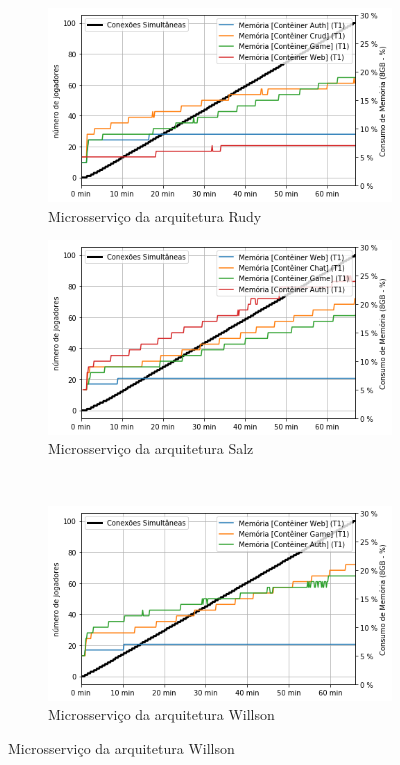 \begin{figure}[htb!]
    \caption{Consumo de memória dos microsserviços}
    \label{fig:experimento_gs_mem}

    \begin{subfigure}{0.5\textwidth}
        \centering
        \includegraphics[width=.95\linewidth]{figuras/testes/r_mem_game.png}
        \caption{Microsserviço da arquitetura Rudy}
        \label{fig:r_mem_game}
    \end{subfigure}%
    \begin{subfigure}{0.5\textwidth}
        \centering
        \includegraphics[width=.95\linewidth]{figuras/testes/s_mem_game.png}
        \caption{Microsserviço da arquitetura Salz}
        \label{fig:s_mem_game}
    \end{subfigure}\\

    \begin{subfigure}{0.5\textwidth}
        \centering
        \includegraphics[width=.95\linewidth]{figuras/testes/w_mem_game.png}
        \caption{Microsserviço da arquitetura Willson}
        \label{fig:w_mem_game}
    \end{subfigure}


\end{figure}
